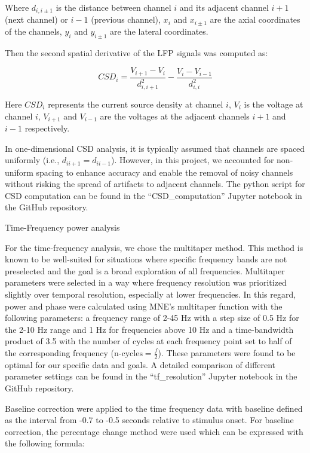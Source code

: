 \documentclass[
  letterpaper,
  DIV=11,
  numbers=noendperiod]{scrartcl}
\begin{document}
Where \(d_{i,i \pm 1}\) is the distance between channel \(i\) and its
adjacent channel \(i+1\) (next channel) or \(i-1\) (previous channel),
\(x_i\) and \(x_{i \pm 1}\) are the axial coordinates of the channels,
\(y_i\) and \(y_{i \pm 1}\) are the lateral coordinates.

Then the second spatial derivative of the LFP signals was computed as:

\[
CSD_i = \frac{V_{i+1} - V_i}{d_{i, i+1}^2} - \frac{V_i - V_{i-1}}{d_{i, i}^2}
\]

Here \(CSD_i\) represents the current source density at channel \(i\),
\(V_i\) is the voltage at channel \(i\), \(V_{i+1}\) and \(V_{i-1}\) are
the voltages at the adjacent channels \(i+1\) and \(i-1\) respectively.

In one-dimensional CSD analysis, it is typically assumed that channels
are spaced uniformly (i.e., \(d_{i i+1} = d_{i i-1}\)). However, in this
project, we accounted for non-uniform spacing to enhance accuracy and
enable the removal of noisy channels without risking the spread of
artifacts to adjacent channels. The python script for CSD computation
can be found in the ``CSD\_computation'' Jupyter notebook in the GitHub
repository.

Time-Frequency power analysis

For the time-frequency analysis, we chose the multitaper method. This
method is known to be well-suited for situations where specific
frequency bands are not preselected and the goal is a broad exploration
of all frequencies. Multitaper parameters were selected in a way where
frequency resolution was prioritized slightly over temporal resolution,
especially at lower frequencies. In this regard, power and phase were
calculated using MNE's multitaper function with the following
parameters: a frequency range of 2-45 Hz with a step size of 0.5 Hz for
the 2-10 Hz range and 1 Hz for frequencies above 10 Hz and a
time-bandwidth product of 3.5 with the number of cycles at each
frequency point set to half of the corresponding frequency
(\(\text{n-cycles} = \frac{f}{2}\)). These parameters were found to be
optimal for our specific data and goals. A detailed comparison of
different parameter settings can be found in the ``tf\_resolution''
Jupyter notebook in the GitHub repository.

Baseline correction were applied to the time frequency data with
baseline defined as the interval from -0.7 to -0.5 seconds relative to
stimulus onset. For baseline correction, the percentage change method
were used which can be expressed with the following formula:
\end{document}
